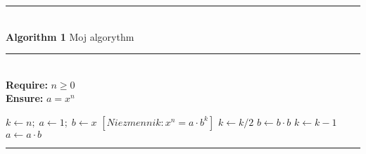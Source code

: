 \documentclass{article}
\begin{document}
\noindent
\rule{10cm}{0.1mm}\\
\textbf{Algorithm 1} Moj algorythm\\
\rule{10cm}{0.1mm}\\
\textbf{Require:} $n\geq 0$\\
\textbf{Ensure:} $a = x^n$
\begin{algorithmic}
\State $k \gets n;\; a\gets 1;\; b\gets x$
$[Niezmennik: x^n=a\cdot b^k]$
    \State $k \gets k/2$
    \State $b \gets b\cdot b$
    \State $k \gets k-1$
    \State $a \gets a\cdot b$
   \EndIf 
\EndWhile

\end{algorithmic}
\rule{10cm}{0.1mm}\\
\end{document}
